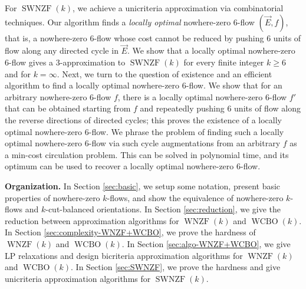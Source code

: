 \documentclass[11pt]{article}
\begin{document}
For $\operatorname{SWNZF}(k)$, we achieve a unicriteria approximation via combinatorial techniques. Our algorithm finds a \emph{locally optimal} nowhere-zero $6$-flow $(\vec{E},f)$, that is, a nowhere-zero $6$-flow whose cost cannot be reduced by pushing $6$ units of flow along any directed cycle in $\vec{E}$. 
We show that a locally optimal nowhere-zero $6$-flow gives a $3$-approximation to $\operatorname{SWNZF}(k)$ for every finite integer $k\geq 6$ and for $k=\infty$.
Next, we turn to the question of existence and an efficient algorithm to find a locally optimal nowhere-zero $6$-flow. 
We show that for an arbitrary nowhere-zero $6$-flow $f$, there is a locally optimal nowhere-zero $6$-flow $f'$ that can be obtained starting from $f$ and repeatedly pushing $6$ units of flow along the reverse directions of directed cycles; this proves the existence of a locally optimal nowhere-zero $6$-flow. We phrase the problem of finding such a locally optimal nowhere-zero $6$-flow via such cycle augmentations from an arbitrary $f$ as a min-cost circulation problem. This can be solved in polynomial time, and its optimum can be used to recover a locally optimal nowhere-zero $6$-flow. 

\vspace{1mm}
\noindent \textbf{Organization.}
In Section \ref{sec:basic}, we setup some notation, present basic properties of nowhere-zero $k$-flows, and show the equivalence of nowhere-zero $k$-flows and $k$-cut-balanced orientations. In Section \ref{sec:reduction}, we give the reduction between approximation algorithms for $\operatorname{WNZF}(k)$ and $\operatorname{WCBO}(k)$. In Section \ref{sec:complexity-WNZF+WCBO}, we prove the hardness of $\operatorname{WNZF}(k)$ and $\operatorname{WCBO}(k)$. In Section \ref{sec:algo-WNZF+WCBO}, we give LP relaxations and design bicriteria approximation algorithms for $\operatorname{WNZF}(k)$ and $\operatorname{WCBO}(k)$. In Section \ref{sec:SWNZF}, we prove the hardness and give unicriteria approximation algorithms for $\operatorname{SWNZF}(k)$. 
\end{document}
